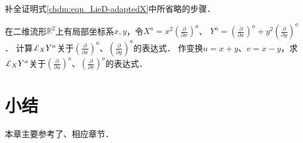 \begin{exercise}
	补全证明式\eqref{chdm:eqn_LieD-adaptedX}中所省略的步骤．
\end{exercise}

\begin{exercise}
	在二维流形$\mathbb{R}^2$上有局部坐标系$x,y$，令$X^a = x^2 (\frac{\partial}{\partial x})^a$、
	$Y^a = (\frac{\partial}{\partial x})^a + y^2 (\frac{\partial}{\partial y})^a$．
	计算$\Lie_X Y^a$关于$(\frac{\partial}{\partial x})^a$、$(\frac{\partial}{\partial y})^a$的表达式．
	作变换$u=x+y$、$v=x-y$，求$\Lie_X Y^a$关于$(\frac{\partial}{\partial u})^a$、$(\frac{\partial}{\partial v})^a$的表达式．
\end{exercise}





\section*{小结}
本章主要参考了\parencite{cc2001-zh}、\parencite{chenwh2001}相应章节．
















\endinput
